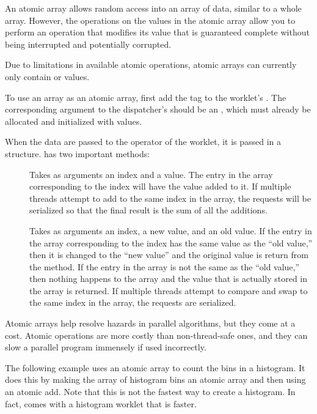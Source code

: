 An atomic array allows random access into an array of data, similar to a whole array.
However, the operations on the values in the atomic array allow you to perform an operation that modifies its value that is guaranteed complete without being interrupted and potentially corrupted.

\begin{commonerrors}
  Due to limitations in available atomic operations, atomic arrays can currently only contain  or  values.
\end{commonerrors}

To use an array as an atomic array, first add the  tag to the worklet's \controlsignature.
The corresponding argument to the dispatcher's  should be an , which must already be allocated and initialized with values.

When the data are passed to the operator of the worklet, it is passed in a  structure.
 has two important methods:
\begin{description}
\item[]
  Takes as arguments an index and a value.
  The entry in the array corresponding to the index will have the value added to it.
  If multiple threads attempt to add to the same index in the array, the requests will be serialized so that the final result is the sum of all the additions.
\item[]
  Takes as arguments an index, a new value, and an old value.
  If the entry in the array corresponding to the index has the same value as the ``old value,'' then it is changed to the ``new value'' and the original value is return from the method.
  If the entry in the array is not the same as the ``old value,'' then nothing happens to the array and the value that is actually stored in the array is returned.
  If multiple threads attempt to compare and swap to the same index in the array, the requests are serialized.
\end{description}

\begin{commonerrors}
  Atomic arrays help resolve hazards in parallel algorithms, but they come at a cost.
  Atomic operations are more costly than non-thread-safe ones, and they can slow a parallel program immensely if used incorrectly.
\end{commonerrors}

The following example uses an atomic array to count the bins in a histogram.
It does this by making the array of histogram bins an atomic array and then using an atomic add.
Note that this is not the fastest way to create a histogram.
In fact, \VTKm comes with a histogram worklet that is faster.

